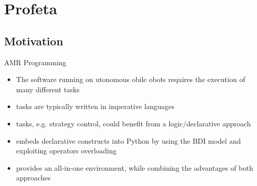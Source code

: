\section{Profeta}

\subsection{Motivation}
\begin{frame}[label=1]{AMR Programming}
  \begin{itemize}
    \item
      The software running on utonomous obile obots
      requires the execution of many different tasks
\N  
    \item
       tasks are typically written in imperative languages 
\n
    \item
       tasks, e.g. strategy control, could benefit 
      from a logic/declarative approach
\N\N  
\pause
    \item
       embeds declarative constructs into Python by
      using the BDI model and exploiting operators overloading
\n    
    \item
       provides an all-in-one environment, while combining
      the advantages of both approaches
  \end{itemize}
% 
\N\N
\end{frame}



